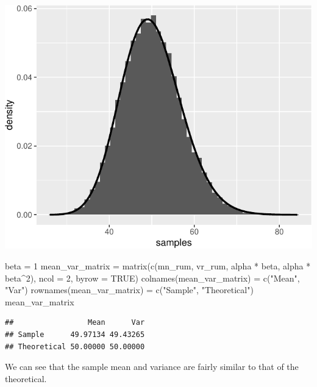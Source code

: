 \documentclass[
]{article}
\newenvironment{Shaded}{\begin{snugshade}}{\end{snugshade}}
\newcommand{\AttributeTok}[1]{\textcolor[rgb]{0.77,0.63,0.00}{#1}}
\newcommand{\ConstantTok}[1]{\textcolor[rgb]{0.00,0.00,0.00}{#1}}
\newcommand{\DecValTok}[1]{\textcolor[rgb]{0.00,0.00,0.81}{#1}}
\newcommand{\FunctionTok}[1]{\textcolor[rgb]{0.00,0.00,0.00}{#1}}
\newcommand{\NormalTok}[1]{#1}
\newcommand{\OtherTok}[1]{\textcolor[rgb]{0.56,0.35,0.01}{#1}}
\newcommand{\SpecialCharTok}[1]{\textcolor[rgb]{0.00,0.00,0.00}{#1}}
\newcommand{\StringTok}[1]{\textcolor[rgb]{0.31,0.60,0.02}{#1}}
\begin{document}
\begin{center}\includegraphics{Project-1_files/figure-latex/unnamed-chunk-8-1} \end{center}

\begin{Shaded}
\begin{Highlighting}[]
\NormalTok{beta }\OtherTok{=} \DecValTok{1}
\NormalTok{mean\_var\_matrix }\OtherTok{=} \FunctionTok{matrix}\NormalTok{(}\FunctionTok{c}\NormalTok{(mn\_rum, vr\_rum, alpha }\SpecialCharTok{*}\NormalTok{ beta, alpha }\SpecialCharTok{*}\NormalTok{ beta}\SpecialCharTok{\^{}}\DecValTok{2}\NormalTok{), }\AttributeTok{ncol =} \DecValTok{2}\NormalTok{, }
    \AttributeTok{byrow =} \ConstantTok{TRUE}\NormalTok{)}
\FunctionTok{colnames}\NormalTok{(mean\_var\_matrix) }\OtherTok{=} \FunctionTok{c}\NormalTok{(}\StringTok{"Mean"}\NormalTok{, }\StringTok{"Var"}\NormalTok{)}
\FunctionTok{rownames}\NormalTok{(mean\_var\_matrix) }\OtherTok{=} \FunctionTok{c}\NormalTok{(}\StringTok{"Sample"}\NormalTok{, }\StringTok{"Theoretical"}\NormalTok{)}
\NormalTok{mean\_var\_matrix}
\end{Highlighting}
\end{Shaded}

\begin{verbatim}
##                 Mean      Var
## Sample      49.97134 49.43265
## Theoretical 50.00000 50.00000
\end{verbatim}

We can see that the sample mean and variance are fairly similar to that
of the theoretical.
\end{document}

